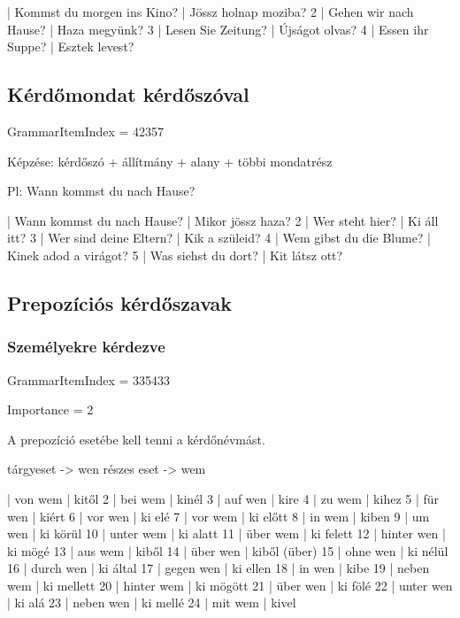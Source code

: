 \documentclass{article}
\newenvironment{desc}{\verbatim}{\endverbatim}
\newenvironment{exmp}{\verbatim}{\endverbatim}
\begin{document}
\begin{exmp}
1 | Kommst du morgen ins Kino? | Jössz holnap moziba?
2 | Gehen wir nach Hause? | Haza megyünk?
3 | Lesen Sie Zeitung? | Újságot olvas?
4 | Essen ihr Suppe? | Esztek levest?
\end{exmp}

\subsection{Kérdőmondat kérdőszóval}

GrammarItemIndex = 42357

\begin{desc}
Képzése: kérdőszó + állítmány + alany + többi mondatrész

Pl: Wann kommst du nach Hause?
\end{desc}

\begin{exmp}
1 | Wann kommst du nach Hause? | Mikor jössz haza?
2 | Wer steht hier? | Ki áll itt?
3 | Wer sind deine Eltern? | Kik a szüleid?
4 | Wem gibst du die Blume? | Kinek adod a virágot?
5 | Was siehst du dort? | Kit látsz ott?
\end{exmp}

\subsection{Prepozíciós kérdőszavak}

\subsubsection{Személyekre kérdezve}

GrammarItemIndex = 335433

Importance = 2

\begin{desc}
A prepozíció esetébe kell tenni a kérdőnévmást.

tárgyeset -> wen
részes eset -> wem
\end{desc}

\begin{exmp}
1 | von wem | kitől
2 | bei wem | kinél
3 | auf wen | kire
4 | zu wem | kihez
5 | für wen | kiért
6 | vor wen | ki elé
7 | vor wem | ki előtt
8 | in wem | kiben
9 | um wen | ki körül
10 | unter wem | ki alatt
11 | über wem | ki felett
12 | hinter wen | ki mögé
13 | aus wem | kiből
14 | über wen | kiből (über)
15 | ohne wen | ki nélül
16 | durch wen | ki által
17 | gegen wen | ki ellen
18 | in wen | kibe
19 | neben wem | ki mellett
20 | hinter wem | ki mögött
21 | über wen | ki fölé
22 | unter wen | ki alá
23 | neben wen | ki mellé
24 | mit wem | kivel
\end{exmp}
\end{document}
